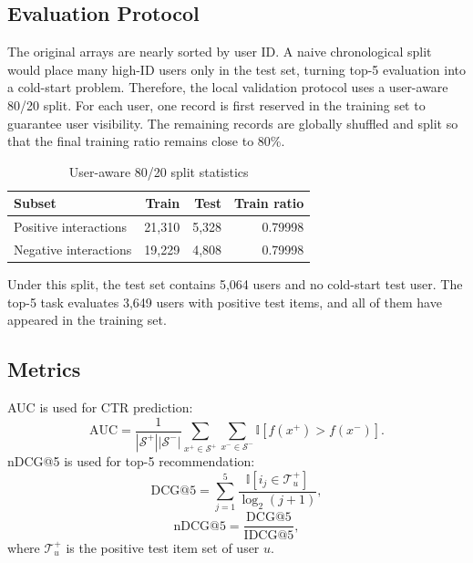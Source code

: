 \documentclass[onecolumn,a4paper,12pt]{IEEEtran}
\begin{document}
\subsection{Evaluation Protocol}

The original arrays are nearly sorted by user ID. A naive chronological split would place many high-ID users only in the test set, turning top-5 evaluation into a cold-start problem. Therefore, the local validation protocol uses a user-aware 80/20 split. For each user, one record is first reserved in the training set to guarantee user visibility. The remaining records are globally shuffled and split so that the final training ratio remains close to 80\%.

\begin{table}[h]
\centering
\caption{User-aware 80/20 split statistics}
\begin{tabular}{lrrr}
\toprule
Subset & Train & Test & Train ratio \\
\midrule
Positive interactions & 21,310 & 5,328 & 0.79998 \\
Negative interactions & 19,229 & 4,808 & 0.79998 \\
\bottomrule
\end{tabular}
\end{table}

Under this split, the test set contains 5,064 users and no cold-start test user. The top-5 task evaluates 3,649 users with positive test items, and all of them have appeared in the training set.

\subsection{Metrics}

AUC is used for CTR prediction:
\begin{equation}
    \mathrm{AUC}
    =
    \frac{1}{|\mathcal{S}^{+}||\mathcal{S}^{-}|}
    \sum_{x^+\in\mathcal{S}^{+}}
    \sum_{x^-\in\mathcal{S}^{-}}
    \mathbb{I}[f(x^+)>f(x^-)].
\end{equation}
nDCG@5 is used for top-5 recommendation:
\begin{equation}
    \mathrm{DCG@5}
    =
    \sum_{j=1}^{5}
    \frac{\mathbb{I}[i_j\in\mathcal{T}_u^{+}]}{\log_2(j+1)},
\end{equation}
\begin{equation}
    \mathrm{nDCG@5}
    =
    \frac{\mathrm{DCG@5}}{\mathrm{IDCG@5}},
\end{equation}
where $\mathcal{T}_u^{+}$ is the positive test item set of user $u$.
\end{document}
